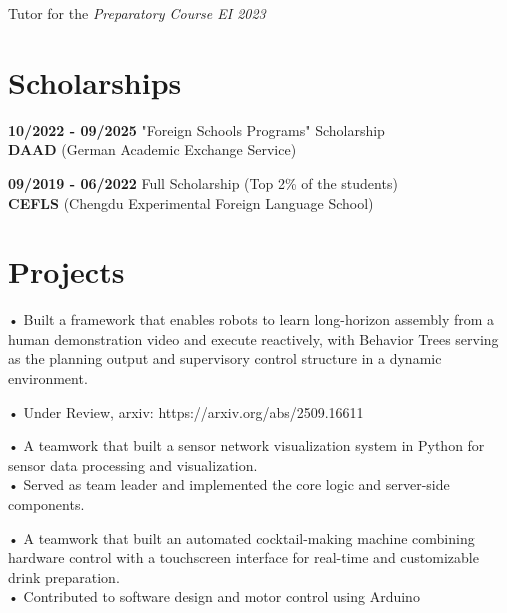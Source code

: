 \documentclass[]{deedy-resume-reversed}
\begin{document}
\begin{minipage}[t]{0.60\textwidth}
\vspace{0.5em}

\vspace{0.2em}
Tutor for the \textit{Preparatory Course EI 2023}
\sectionsep




\section{Scholarships}

\textbf{10/2022 - 09/2025} "Foreign Schools Programs" Scholarship\\
\quad \textbf{DAAD} (German Academic Exchange Service)

\vspace{0.2em}
\textbf{09/2019 - 06/2022} Full Scholarship (Top 2\% of the students)\\
\quad \textbf{CEFLS} (Chengdu Experimental Foreign Language School)
\sectionsep

\section{Projects}

\vspace{0.2em}

• Built a framework that enables robots to learn long-horizon assembly from a human demonstration video and execute reactively, with Behavior Trees serving as the planning output and supervisory control structure in a dynamic environment.

\vspace{0.1em}
• Under Review, arxiv: https://arxiv.org/abs/2509.16611


\vspace{0.5em}
\vspace{0.2em}
• A teamwork that built a sensor network visualization system in Python for sensor data processing and visualization.\\
• Served as team leader and implemented the core logic and server-side components.

\vspace{0.5em}
\vspace{0.2em}
• A teamwork that built an automated cocktail-making machine combining hardware control with a touchscreen interface for real-time and customizable drink preparation. \\
• Contributed to software design and motor control using Arduino

\sectionsep

\end{minipage}
\end{document}
